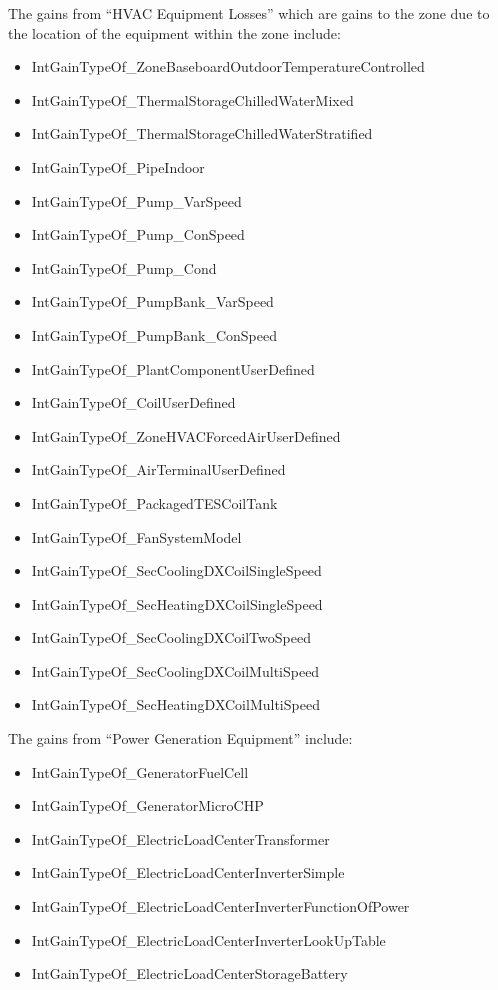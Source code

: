 The gains from ``HVAC Equipment Losses'' which are gains to the zone due to the location of the equipment within the zone include:

\begin{itemize}
\item
  IntGainTypeOf\_ZoneBaseboardOutdoorTemperatureControlled
\item
  IntGainTypeOf\_ThermalStorageChilledWaterMixed
\item
  IntGainTypeOf\_ThermalStorageChilledWaterStratified
\item
  IntGainTypeOf\_PipeIndoor
\item
  IntGainTypeOf\_Pump\_VarSpeed
\item
  IntGainTypeOf\_Pump\_ConSpeed
\item
  IntGainTypeOf\_Pump\_Cond
\item
  IntGainTypeOf\_PumpBank\_VarSpeed
\item
  IntGainTypeOf\_PumpBank\_ConSpeed
\item
  IntGainTypeOf\_PlantComponentUserDefined
\item
  IntGainTypeOf\_CoilUserDefined
\item
  IntGainTypeOf\_ZoneHVACForcedAirUserDefined
\item
  IntGainTypeOf\_AirTerminalUserDefined
\item
  IntGainTypeOf\_PackagedTESCoilTank
\item
  IntGainTypeOf\_FanSystemModel
\item
  IntGainTypeOf\_SecCoolingDXCoilSingleSpeed
\item
  IntGainTypeOf\_SecHeatingDXCoilSingleSpeed
\item
  IntGainTypeOf\_SecCoolingDXCoilTwoSpeed
\item
  IntGainTypeOf\_SecCoolingDXCoilMultiSpeed
\item
  IntGainTypeOf\_SecHeatingDXCoilMultiSpeed
\end{itemize}

The gains from ``Power Generation Equipment'' include:

\begin{itemize}
\item
  IntGainTypeOf\_GeneratorFuelCell
\item
  IntGainTypeOf\_GeneratorMicroCHP
\item
  IntGainTypeOf\_ElectricLoadCenterTransformer
\item
  IntGainTypeOf\_ElectricLoadCenterInverterSimple
\item
  IntGainTypeOf\_ElectricLoadCenterInverterFunctionOfPower
\item
  IntGainTypeOf\_ElectricLoadCenterInverterLookUpTable
\item
  IntGainTypeOf\_ElectricLoadCenterStorageBattery
\end{itemize}

